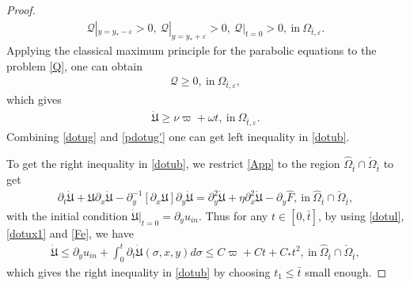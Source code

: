 \documentclass{amsart}
\numberwithin{equation}{section}
\begin{document}
\begin{proof}
\begin{align*}
\mathcal{Q}|_{y=y_{*}-\varepsilon}>0,~\mathcal{Q}|_{y=y_{*}+\varepsilon}>0,~\mathcal{Q}|_{t=0}>0,~\text{in}~\Omega_{\bar{t},\varepsilon}.
\end{align*}
Applying the classical maximum principle for the parabolic equations to the problem \eqref{Q}, one can obtain
\begin{align*}
\mathcal{Q}\geq0,~\text{in}~\Omega_{\bar{t},\varepsilon},
\end{align*}
which gives
\begin{align}\label{pdotug'}
\dot{\mathfrak{U}}\geq \nu\varpi+\omega t,~\text{in}~\Omega_{\bar{t},\varepsilon}.
\end{align}
Combining \eqref{dotug} and \eqref{pdotug'} one can get left inequality in \eqref{dotub}.

To get the right inequality in \eqref{dotub}, we restrict \eqref{App} to the region $\hat{\Omega}_{\bar{t}}\cap\check{\Omega}_{\bar{t}}$ to get
\begin{align}
\partial_{t}\dot{\mathfrak{U}}
+\mathfrak{U}\partial_{x}\dot{\mathfrak{U}}
-\partial_{y}^{-1}[\partial_{x}\mathfrak{U}]\partial_{y}\dot{\mathfrak{U}}
=\partial_{y}^{2}\dot{\mathfrak{U}}+\eta\partial_{x}^{2}\dot{\mathfrak{U}}-\partial_{y}\hat{F},~\text{in}~\hat{\Omega}_{\bar{t}}\cap\check{\Omega}_{\bar{t}},
\end{align}
with the initial condition $\dot{\mathfrak{U}}|_{t=0}=\partial_{y}u_{in}$. Thus for any $t\in[0,\bar{t}]$, by using \eqref{dotul}, \eqref{dotux1} and \eqref{Fe}, we have
\begin{align*}
\dot{\mathfrak{U}}
\leq \partial_{y}u_{in}+\int_{0}^{t}\partial_{t}\dot{\mathfrak{U}}(\sigma,x,y)d\sigma
\leq C\varpi+Ct+C_{*}t^{2},~\text{in}~\hat{\Omega}_{\bar{t}}\cap\check{\Omega}_{\bar{t}},
\end{align*}
which gives the right inequality in \eqref{dotub} by choosing $t_{1}\leq\bar{t}$ small enough.

\end{proof}
\end{document}
